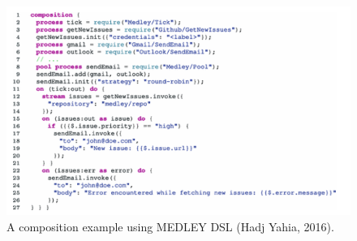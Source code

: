 \documentclass{article}
\begin{document}
\begin{itemize}
\begin{figure}[ht]
\includegraphics{medley.png}
\caption{A composition example using MEDLEY DSL (Hadj Yahia, 2016).}
\end{figure}

\end{itemize}

\pagebreak 
\end{document}
